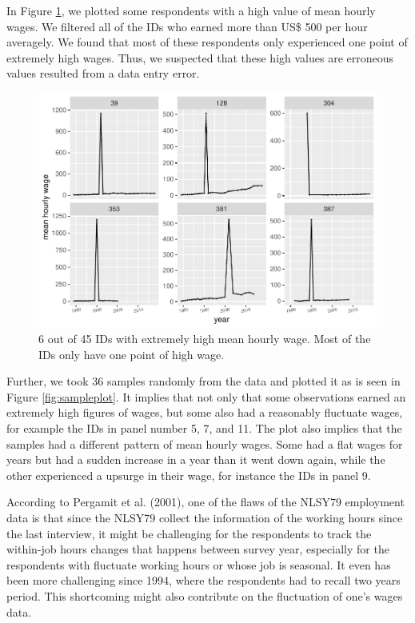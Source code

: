 \documentclass{article}
\begin{document}
In Figure \ref{fig:high-wages}, we plotted some respondents with a high value of mean hourly wages. We filtered all of the IDs who earned more than US\$ 500 per hour averagely. We found that most of these respondents only experienced one point of extremely high wages. Thus, we suspected that these high values are erroneous values resulted from a data entry error.

\begin{figure}
\centering
\includegraphics{figures/high-wages-1.pdf}
\caption{\label{fig:high-wages}6 out of 45 IDs with extremely high mean hourly wage. Most of the IDs only have one point of high wage.}
\end{figure}

Further, we took 36 samples randomly from the data and plotted it as is seen in Figure \ref{fig:sampleplot}. It implies that not only that some observations earned an extremely high figures of wages, but some also had a reasonably fluctuate wages, for example the IDs in panel number 5, 7, and 11. The plot also implies that the samples had a different pattern of mean hourly wages. Some had a flat wages for years but had a sudden increase in a year than it went down again, while the other experienced a upsurge in their wage, for instance the IDs in panel 9.

According to Pergamit et al. (2001), one of the flaws of the NLSY79 employment data is that since the NLSY79 collect the information of the working hours since the last interview, it might be challenging for the respondents to track the within-job hours changes that happens between survey year, especially for the respondents with fluctuate working hours or whose job is seasonal. It even has been more challenging since 1994, where the respondents had to recall two years period. This shortcoming might also contribute on the fluctuation of one's wages data.
\end{document}
